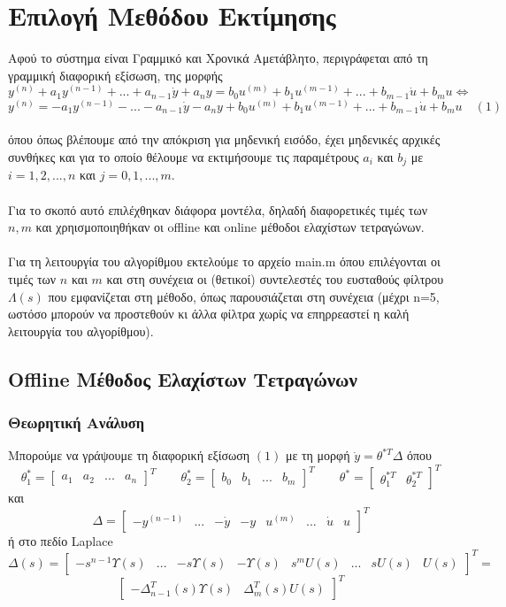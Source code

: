 \documentclass[12pt]{article}
\begin{document}
\section{Επιλογή Μεθόδου Εκτίμησης}
Αφού το σύστημα είναι Γραμμικό και Χρονικά Αμετάβλητο,  περιγράφεται από τη γραμμική διαφορική εξίσωση, της μορφής
\\
\[ y^{(n)}+a_1y^{(n-1)}+...+a_{n-1}\dot{y}+a_{n}y=b_0 u^{(m)}+b_1u^{(m-1)}+...+b_{m-1}\dot{u}+b_{m}u \Leftrightarrow\]
\[ y^{(n)}=-a_1y^{(n-1)}-...-a_{n-1}\dot{y}-a_{n}y+b_0 u^{(m)}+b_1u^{(m-1)}+...+b_{m-1}\dot{u}+b_{m}u \quad (1)\]
\\
όπου όπως βλέπουμε από την απόκριση για μηδενική εισόδο, έχει μηδενικές αρχικές συνθήκες και για το οποίο θέλουμε να εκτιμήσουμε τις παραμέτρους $a_i$ και $b_j$ με $i=1,2,...,n$ και $j=0,1,...,m$.
\\ \\
Για το σκοπό αυτό επιλέχθηκαν διάφορα μοντέλα, δηλαδή διαφορετικές τιμές των $n,m$ και χρηισμοποιηθήκαν οι offline και online μέθοδοι ελαχίστων τετραγώνων.
\\ \\
Για τη λειτουργία του αλγορίθμου εκτελούμε το αρχείο main.m όπου επιλέγονται οι τιμές των $n$ και $m$ και στη συνέχεια οι (θετικοί) συντελεστές του ευσταθούς φίλτρου $\Lambda(s)$ που εμφανίζεται στη μέθοδο, όπως παρουσιάζεται στη συνέχεια (μέχρι n=5, ωστόσο μπορούν να προστεθούν κι άλλα φίλτρα χωρίς να επηρρεαστεί η καλή λειτουργία του αλγορίθμου).
\subsection{Offline Μέθοδος Ελαχίστων Τετραγώνων}
\subsubsection{Θεωρητική Ανάλυση}
Μπορούμε να γράψουμε τη διαφορική εξίσωση $\left(1\right)$  με τη μορφή \quad $\dot{y}=\theta^{*T}\Delta$ \quad όπου
\[\theta_{1}^{*}=
\begin{bmatrix}
		a_1 & a_2 & ... & a_n
\end{bmatrix}^{T}
\qquad
\theta_{2}^{*}=
\begin{bmatrix}
		b_0 & b_1 & ... & b_m
\end{bmatrix}^{T}
\qquad
\theta^{*}=
\begin{bmatrix}
		\theta_{1}^{*T} & \theta_{2}^{*T}
\end{bmatrix}^{T}
\]
και 
\[ \Delta=
\begin{bmatrix}
	-y^{(n-1)} & ...  & -\dot{y} & -y & u^{(m)} & ...  & \dot{u} & u
\end{bmatrix}^{T} \]
ή στο πεδίο Laplace
 \[ \Delta(s)=
\begin{bmatrix}
		 -s^{n-1}Υ(s) & ... & -sΥ(s) & -Υ(s) & s^{m}U(s) & ... & sU(s) & U(s)
\end{bmatrix}^{T} =\]
\[ \begin{bmatrix}
		-\Delta_{n-1}^{T}(s)Υ(s) & \Delta_{m}^{T}(s)U(s)
\end{bmatrix}^{T}\]
\end{document}
